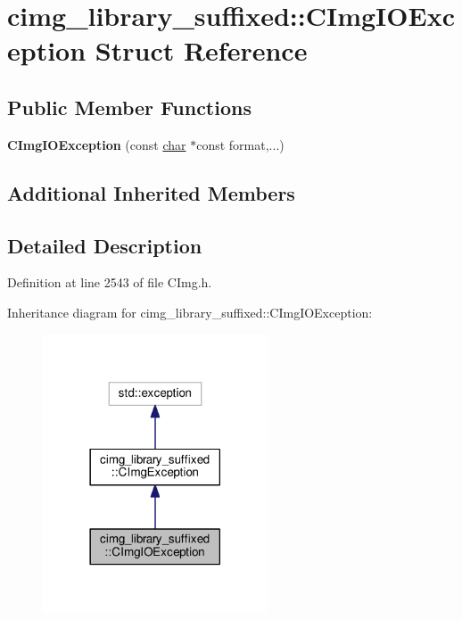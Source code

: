 \hypertarget{structcimg__library__suffixed_1_1CImgIOException}{}\section{cimg\+\_\+library\+\_\+suffixed\+:\+:C\+Img\+I\+O\+Exception Struct Reference}
\label{structcimg__library__suffixed_1_1CImgIOException}
\subsection*{Public Member Functions}
\begin{DoxyCompactItemize}
\item 
\mbox{\label{structcimg__library__suffixed_1_1CImgIOException_a19c7321d0ecaaffe9a03cdfe88e415d3}} 
{\bfseries C\+Img\+I\+O\+Exception} (const \hyperlink{classchar}{char} $\ast$const format,...)
\end{DoxyCompactItemize}
\subsection*{Additional Inherited Members}


\subsection{Detailed Description}


Definition at line 2543 of file C\+Img.\+h.



Inheritance diagram for cimg\+\_\+library\+\_\+suffixed\+:\+:C\+Img\+I\+O\+Exception\+:
\nopagebreak
\begin{figure}[H]
\begin{center}
\leavevmode
\includegraphics[width=189pt]{db/d74/structcimg__library__suffixed_1_1CImgIOException__inherit__graph}
\end{center}
\end{figure}


